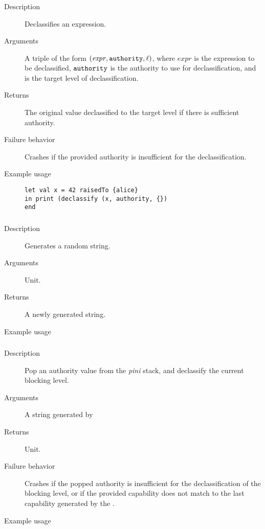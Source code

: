 \subsubsection{}
\begin{description}
    \item [Description] Declassifies an expression.
    \item [Arguments] A triple of the form $(\mathit{expr}, {\mathtt{authority}}, {\mathtt{\ell}} )$, where $\mathit{expr}$ is the expression to be declassified, ${\mathtt{authority}}$ is the authority to use for declassification, and \code{\ell} is the target level of declassification.
    \item [Returns] The original value declassified to the target level if there is sufficient authority. 
    \item [Failure behavior] Crashes if the provided authority is insufficient for the declassification.
    \item [Example usage] 
\begin{minipage}[t]{30em}
\begin{verbatim}
let val x = 42 raisedTo {alice}
in print (declassify (x, authority, {})
end    
\end{verbatim}


 \end{minipage}

    
\end{description}


\subsubsection{}
\begin{description}
    \item [Description] Generates a random string.
    \item [Arguments] Unit.
    \item [Returns] A newly generated string.
    \item [Example usage] 
\end{description}

\subsubsection{}
\begin{description}
    \item [Description] Pop an authority value from the \emph{pini} stack, and declassify the current blocking level.
    \item [Arguments] A string generated by 
    \item [Returns] Unit.
    \item [Failure behavior] Crashes if the popped authority is insufficient for the declassification of the blocking level,
or if the provided capability does not match to the last capability generated by the .
    \item [Example usage] 
\end{description}

